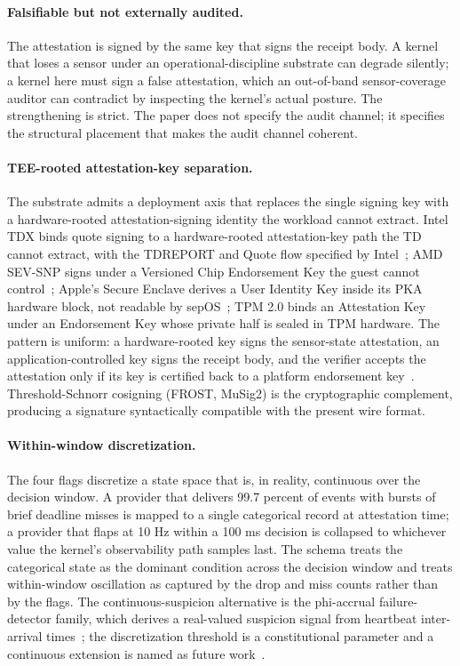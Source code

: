\paragraph{Falsifiable but not externally audited.}
The attestation is signed by the same key that signs the receipt body. A kernel that loses a sensor under an operational-discipline substrate can degrade silently; a kernel here must sign a false attestation, which an out-of-band sensor-coverage auditor can contradict by inspecting the kernel's actual posture. The strengthening is strict. The paper does not specify the audit channel; it specifies the structural placement that makes the audit channel coherent.

\paragraph{TEE-rooted attestation-key separation.}
The substrate admits a deployment axis that replaces the single signing key with a hardware-rooted attestation-signing identity the workload cannot extract. Intel TDX binds quote signing to a hardware-rooted attestation-key path the TD cannot extract, with the TDREPORT and Quote flow specified by Intel~\cite{intelTDXSpec2023}; AMD SEV-SNP signs under a Versioned Chip Endorsement Key the guest cannot control~\cite{amdSEVSNPSpec2025}; Apple's Secure Enclave derives a User Identity Key inside its PKA hardware block, not readable by sepOS~\cite{applePlatformSecurity2024}; TPM 2.0 binds an Attestation Key under an Endorsement Key whose private half is sealed in TPM hardware. The pattern is uniform: a hardware-rooted key signs the sensor-state attestation, an application-controlled key signs the receipt body, and the verifier accepts the attestation only if its key is certified back to a platform endorsement key~\cite{rfc9334RATS}. Threshold-Schnorr cosigning (FROST, MuSig2) is the cryptographic complement, producing a signature syntactically compatible with the present wire format.

\paragraph{Within-window discretization.}
The four flags discretize a state space that is, in reality, continuous over the decision window. A provider that delivers 99.7 percent of events with bursts of brief deadline misses is mapped to a single categorical record at attestation time; a provider that flaps at 10 Hz within a 100 ms decision is collapsed to whichever value the kernel's observability path samples last. The schema treats the categorical state as the dominant condition across the decision window and treats within-window oscillation as captured by the drop and miss counts rather than by the flags. The continuous-suspicion alternative is the phi-accrual failure-detector family, which derives a real-valued suspicion signal from heartbeat inter-arrival times~\cite{hayashibaraPhiAccrual2004}; the discretization threshold is a constitutional parameter and a continuous extension is named as future work~\cite{cardenasICS2008}.

